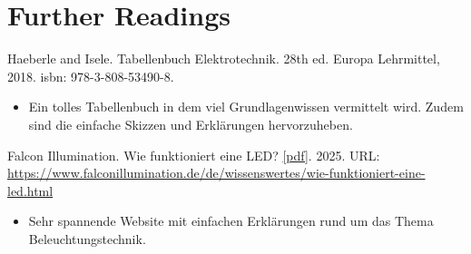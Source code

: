 \section{Further Readings}
Haeberle and Isele. Tabellenbuch Elektrotechnik. 28th ed. Europa Lehrmittel, 2018. isbn: 978-3-808-53490-8.\cite{Haeberle:2018}
\begin{itemize}
	\item Ein tolles Tabellenbuch in dem viel Grundlagenwissen vermittelt wird. Zudem sind die einfache Skizzen und Erklärungen hervorzuheben.
\end{itemize}

Falcon Illumination. Wie funktioniert eine LED? {\textcolor{blue}{\href{../../../MLbib/falconOnline.pdf}{[pdf]}}}. 2025.  
URL: \url{https://www.falconillumination.de/de/wissenswertes/wie-funktioniert-eine-led.html} \cite{Falcon:2025}
\begin{itemize}
	\item Sehr spannende Website mit einfachen Erklärungen rund um das Thema Beleuchtungstechnik.
\end{itemize}